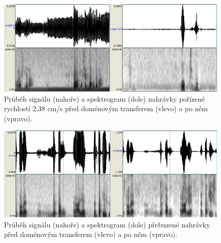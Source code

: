 \begin{figure}[htpb]
\includegraphics[scale=0.4]{rc/gan-plzen.eps}
\caption{Průběh signálu (nahoře) a spektrogram (dole) nahrávky pořízené
rychlostí 2,38 cm/s před doménovým transferem (vlevo) a po něm (vpravo).}
\label{fig:gan:plzen}
\end{figure}

\begin{figure}[htpb]
\includegraphics[scale=0.4]{rc/gan-overdrive.eps}
\caption{Průběh signálu (nahoře) a spektrogram (dole) přebuzené nahrávky
před doménovým transferem (vlevo) a po něm (vpravo).}
\label{fig:gan:overdrive}
\end{figure}
